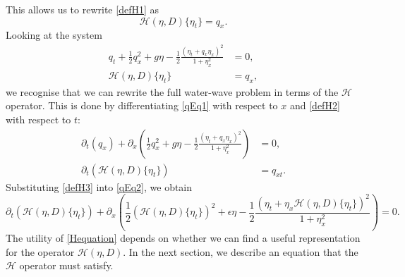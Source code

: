 \documentclass[10pt,reqno,oneside,a4paper]{article}
\begin{document}
This allows us to rewrite \eqref{defH1} as 
\begin{equation}\label{defH2}
\mathcal{H}(\eta, D) \{ \eta_t \} = q_x.
\end{equation}
Looking at the system
\begin{align*}
q_t + \frac{1}{2}q_x^2 + g \eta - \frac{1}{2} \frac{(\eta_t + q_x \eta_x)^2}{1 + \eta_x^2} &= 0, \\
\mathcal{H}(\eta, D) \{ \eta_t \} &= q_x,
\end{align*}
we recognise that we can rewrite the full water-wave problem in terms of the $\mathcal{H}$ operator. This is done by differentiating \eqref{qEq1} with respect to $x$ and \eqref{defH2} with respect to $t:$
\begin{align}
\partial_t(q_x) + \partial_x\left(\frac{1}{2}q_x^2 + g \eta - \frac{1}{2} \frac{(\eta_t + q_x \eta_x)^2}{1 + \eta_x^2}\right) &= 0, \label{qEq2} \\
\partial_t(\mathcal{H}(\eta, D) \{ \eta_t \}) &= q_{xt}. \label{defH3}
\end{align}
Substituting \eqref{defH3} into \eqref{qEq2}, we obtain 
\begin{equation}\label{Hequation}
\partial_t\left(\mathcal{H}(\eta, D)\{ \eta_t\} \right) + \partial_x\left( \frac{1}{2}\left(\mathcal{H}(\eta, D)\{\eta_t\} \right)^2 + \epsilon \eta - \frac{1}{2} \frac{(\eta_t + \eta_x \mathcal{H}(\eta, D)\{ \eta_t\})^2}{1+\eta_x^2}\right) = 0.
\end{equation}
The utility of \eqref{Hequation} depends on whether we can find a useful representation for the operator $\mathcal{H}(\eta, D).$ In the next section, we describe an equation that the $\mathcal{H}$ operator must satisfy. 
\end{document}
